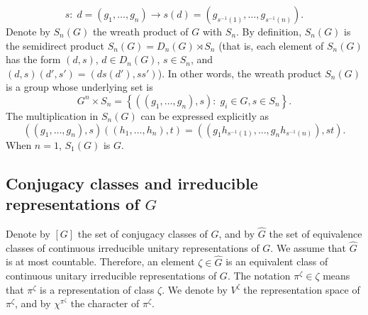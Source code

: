 \documentclass[10pt,a4paper]{amsart}
\begin{document}
$$
s:\; d=\left(g_1,\ldots,g_n\right)\longrightarrow s(d)=\left(g_{s^{-1}(1)},\ldots,g_{s^{-1}(n)}\right).
$$
Denote by $S_n(G)$ the wreath product of $G$ with $S_n$. By definition, $S_n(G)$ is the semidirect product $S_n(G)=D_n(G)\rtimes S_n$ (that is, each element of $S_n(G)$ has the form
$(d,s)$, $d\in D_n(G)$, $s\in S_n$, and $(d,s)(d',s')=(ds(d'),ss')$).
In other words,  the wreath product $S_n\left(G\right)$
is a group whose underlying set is
$$
G^n\times S_n=\left\{\left(\left(g_1,\ldots,g_n\right),s\right):\; g_i\in G, s\in S_n\right\}.
$$
The multiplication in $S_n\left(G\right)$ can be expressed explicitly as
$$
\left(\left(g_1,\ldots,g_n\right),s\right)
\left(\left(h_1,\ldots,h_n\right),t\right)
=\left(\left(g_1h_{s^{-1}(1)},\ldots,g_nh_{s^{-1}(n)}\right),st\right).
$$
When $n=1$, $S_1\left(G\right)$ is $G$.
\subsection{Conjugacy classes and irreducible representations of $G$}\label{NotSection1.2}
Denote by $\left[G\right]$ the set of conjugacy classes
of $G$, and by $\widehat{G}$ the set of equivalence classes of continuous irreducible
unitary representations of $G$. We assume that $\widehat{G}$ is at most countable.
Therefore, an element $\zeta\in\widehat{G}$ is an equivalent class of continuous unitary irreducible representations of $G$.  The notation $\pi^{\zeta}\in\zeta$ means that $\pi^{\zeta}$ is a representation of class $\zeta$. We denote by $V^{\zeta}$ the representation space
of $\pi^{\zeta}$, and by $\chi^{\pi^\zeta}$ the character of $\pi^{\zeta}$.
\end{document}
